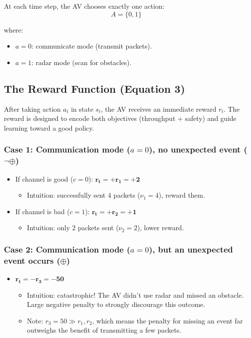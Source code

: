 \documentclass[12pt,a4paper]{article}
\begin{document}
At each time step, the AV chooses exactly one action:
\begin{equation}
A = \{0, 1\}
\end{equation}

\noindent where:
\begin{itemize}
    \item $a = 0$: communicate mode (transmit packets).
    \item $a = 1$: radar mode (scan for obstacles).
\end{itemize}

\subsection{The Reward Function (Equation 3)}

After taking action $a_t$ in state $s_t$, the AV receives an immediate reward $r_t$. The reward is designed to encode both objectives (throughput + safety) and guide learning toward a good policy.

\subsubsection{Case 1: Communication mode ($a = 0$), no unexpected event ($\neg\oplus$)}
\begin{itemize}
    \item If channel is good ($c = 0$): $\mathbf{r_t = +r_1 = +2}$
    \begin{itemize}
        \item Intuition: successfully sent 4 packets ($\nu_1 = 4$), reward them.
    \end{itemize}
    \item If channel is bad ($c = 1$): $\mathbf{r_t = +r_2 = +1}$
    \begin{itemize}
        \item Intuition: only 2 packets sent ($\nu_2 = 2$), lower reward.
    \end{itemize}
\end{itemize}

\subsubsection{Case 2: Communication mode ($a = 0$), but an unexpected event occurs ($\oplus$)}
\begin{itemize}
    \item $\mathbf{r_t = -r_3 = -50}$
    \begin{itemize}
        \item Intuition: catastrophic! The AV didn't use radar and missed an obstacle. Large negative penalty to strongly discourage this outcome.
        \item Note: $r_3 = 50 \gg r_1, r_2$, which means the penalty for missing an event far outweighs the benefit of transmitting a few packets.
    \end{itemize}
\end{itemize}
\end{document}
